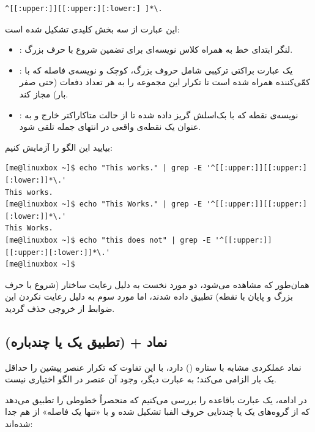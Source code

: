 \begin{latin}
\begin{lstlisting}
^[[:upper:]][[:upper:][:lower:] ]*\.
\end{lstlisting}
\end{latin}

این عبارت از سه بخش کلیدی تشکیل شده است:

\begin{itemize}
  \item \cmd{\^{}[[:upper:]]}: لنگر ابتدای خط به همراه کلاس نویسه‌ای برای تضمین شروع با حرف بزرگ.
  \item \cmd{[[:upper:][:lower:] ]*}: یک عبارت براکتی ترکیبی شامل حروف بزرگ، کوچک و نویسه‌ی فاصله که با کمّی‌کننده \cmd{*} همراه شده است تا تکرار این مجموعه را به هر تعداد دفعات (حتی صفر بار) مجاز کند.
  \item {}: نویسه‌ی نقطه که با بک‌اسلش گریز داده شده تا از حالت متاکاراکتر خارج و به عنوان یک نقطه‌ی واقعی در انتهای جمله تلقی شود.
\end{itemize}

بیایید این الگو را آزمایش کنیم:

\begin{latin}
\begin{lstlisting}
[me@linuxbox ~]$ echo "This works." | grep -E '^[[:upper:]][[:upper:][:lower:]]*\.'
This works.
[me@linuxbox ~]$ echo "This Works." | grep -E '^[[:upper:]][[:upper:][:lower:]]*\.'
This Works.
[me@linuxbox ~]$ echo "this does not" | grep -E '^[[:upper:]][[:upper:][:lower:]]*\.'
[me@linuxbox ~]$
\end{lstlisting}
\end{latin}

همان‌طور که مشاهده می‌شود، دو مورد نخست به دلیل رعایت ساختار (شروع با حرف بزرگ و پایان با نقطه) تطبیق داده شدند، اما مورد سوم به دلیل رعایت نکردن این ضوابط از خروجی حذف گردید.

\subsection{نماد + (تطبیق یک یا چندباره)}

نماد \cmd{+} عملکردی مشابه با ستاره (\cmd{*}) دارد، با این تفاوت که تکرار عنصر پیشین را حداقل یک بار الزامی می‌کند؛ به عبارت دیگر، وجود آن عنصر در الگو اختیاری نیست.

در ادامه، یک عبارت باقاعده را بررسی می‌کنیم که منحصراً خطوطی را تطبیق می‌دهد که از گروه‌های یک یا چندتایی حروف الفبا تشکیل شده و با «تنها یک فاصله» از هم جدا شده‌اند:

